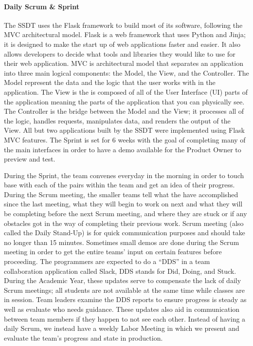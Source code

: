 \paragraph{ Daily Scrum \& Sprint}
The SSDT uses the Flask framework to build most of its software, following the MVC architectural model. Flask is a web framework that uses Python and Jinja; it is designed to make the start up of web applications faster and easier. It also allows developers to decide what tools and libraries they would like to use for their web application. MVC is architectural model that separates an application into three main logical components: the Model, the View, and the Controller. The Model represent the data and the logic that the user works with in the application. The View is the is composed of all of the User Interface (UI) parts of the application meaning the parts of the application that you can physically see. The Controller is the bridge between the Model and the View; it processes all of the logic, handles requests, manipulates data, and renders the output of the View. All but two applications built by the SSDT were implemented using Flask MVC features. The Sprint is set for 6 weeks with the goal of completing many of the main interfaces in order to have a demo available for  the Product Owner to preview and test.

During the Sprint, the team convenes everyday in the morning in order to touch base with each of the pairs within the team and get an idea of their progress. During the Scrum meeting, the smaller teams tell what the have accomplished since the last meeting, what they will begin to work on next and what they will be completing before the next Scrum meeting, and where they are stuck or if any obstacles got in the way of completing their previous work. Scrum meeting (also called the Daily Stand-Up) is for quick communication purposes and should take no longer than 15 minutes. Sometimes small demos are done during the Scrum meeting in order to get the entire teams' input on certain features before proceeding. The programmers are expected to do a ``DDS'' in a team collaboration application called Slack, DDS stands for Did, Doing, and Stuck. During the Academic Year, these updates serve to compensate the lack of daily Scrum meetings; all students are not available at the same time while classes are in session. Team leaders examine the DDS reports to ensure progress is steady as well as evaluate who needs guidance. These updates also aid in communication between team members if they happen to not see each other. Instead of having a daily Scrum, we instead have a weekly Labor Meeting in which we present and evaluate the team's progress and state in production.

